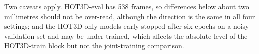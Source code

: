 Two caveats apply. HOT3D-eval has 538 frames, so differences below about two millimetres should not be over-read, although the direction is the same in all four settings; and the HOT3D-only models early-stopped after six epochs on a noisy validation set and may be under-trained, which affects the absolute level of the HOT3D-train block but not the joint-training comparison.
